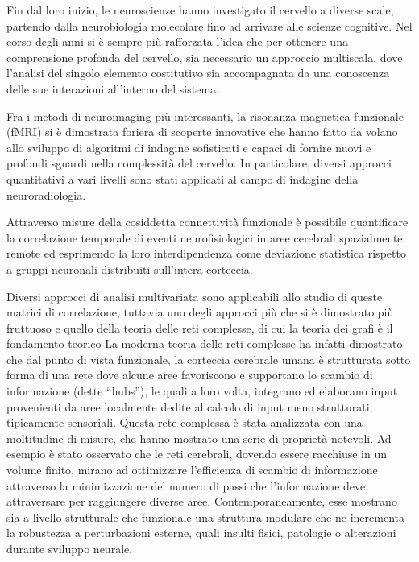 Fin dal loro inizio, le neuroscienze hanno investigato il cervello a diverse scale, partendo dalla neurobiologia molecolare fino ad arrivare alle scienze cognitive.
Nel corso degli anni si è sempre più rafforzata l'idea che per ottenere una comprensione profonda del cervello, sia necessario un approccio multiscala, dove l'analisi del singolo elemento costitutivo sia accompagnata da una conoscenza delle sue interazioni all'interno del sistema.

Fra i metodi di neuroimaging più interessanti, la risonanza magnetica funzionale (fMRI) si è dimostrata foriera di scoperte innovative che hanno fatto da volano allo sviluppo di algoritmi di indagine sofisticati e capaci di fornire nuovi e profondi sguardi nella complessità del cervello.
In particolare, diversi approcci quantitativi a vari livelli sono stati applicati al campo di indagine della neuroradiologia.

Attraverso misure della cosiddetta connettività funzionale è possibile quantificare la correlazione temporale di eventi neurofisiologici in aree cerebrali spazialmente remote ed esprimendo la loro interdipendenza come deviazione statistica rispetto a gruppi neuronali distribuiti sull'intera corteccia.

Diversi approcci di analisi multivariata sono applicabili allo studio di queste matrici di correlazione, tuttavia uno degli approcci più che si è dimostrato più fruttuoso e quello della teoria delle reti complesse, di cui la teoria dei grafi è il fondamento teorico
La moderna teoria delle reti complesse ha infatti dimostrato che dal punto di vista funzionale, la corteccia cerebrale umana è strutturata sotto forma di una rete dove alcune aree favoriscono e supportano lo scambio di informazione (dette ``hubs''), le quali a loro volta, integrano ed elaborano input provenienti da aree localmente dedite al calcolo di input meno strutturati, tipicamente sensoriali.
Questa rete complessa è stata analizzata con una moltitudine di misure, che hanno mostrato una serie di proprietà notevoli.
Ad esempio è stato osservato che le reti cerebrali, dovendo essere racchiuse in un volume finito, mirano ad ottimizzare l'efficienza di scambio di informazione attraverso la minimizzazione del numero di passi che l'informazione deve attraversare per raggiungere diverse aree. Contemporaneamente, esse mostrano sia a livello strutturale che funzionale una struttura modulare che ne incrementa la robustezza a perturbazioni esterne, quali insulti fisici, patologie o alterazioni durante sviluppo neurale.

